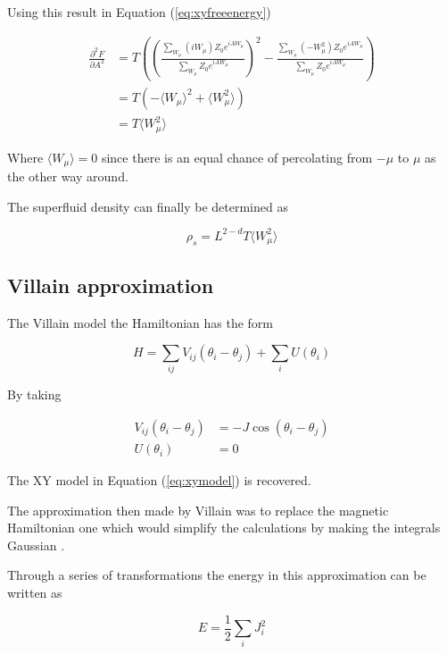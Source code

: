 Using this result in Equation (\ref{eq:xyfreeenergy})

\begin{align}
    \frac{\partial^2 F}{\partial A^2} &= T \left ( \left ( \frac{\sum_{W_\mu} (i W_\mu) Z_0 e^{iAW_\mu}}{\sum_{W_\mu} Z_0 e^{iAW_\mu}} \right )^2 - \frac{\sum_{W_\mu} (- W_\mu^2) Z_0 e^{iAW_\mu}}{\sum_{W_\mu} Z_0 e^{iAW_\mu}} \right ) \\
%
    &= T \left ( -\langle W_\mu \rangle^2 + \langle W_\mu^2 \rangle \right ) \\
%
    &= T \langle W_\mu^2 \rangle
\end{align}

Where $\langle W_\mu \rangle = 0$ since there is an equal chance of percolating from $-\mu$ to $\mu$ as the other way around.

The superfluid density can finally be determined as

\begin{equation}
    \rho_s = L^{2 - d} T \langle W_\mu^2 \rangle 
\end{equation}

\subsection{Villain approximation}
\label{subsec:villainApprox}


The Villain model the Hamiltonian has the form \cite{Villain:VillainOriginalPaper}

\begin{equation}    
    H = \sum_{ij} V_{ij}( \theta_i - \theta_j) + \sum_i U(\theta_i)
\end{equation}

By taking

\begin{align}
    V_{ij}( \theta_i - \theta_j) &= -J \cos ( \theta_i - \theta_j) \\
    U( \theta_i ) &= 0
\end{align}

The XY model in Equation (\ref{eq:xymodel}) is recovered.

The approximation then made by Villain was to replace the magnetic Hamiltonian one which would simplify the calculations by making the integrals Gaussian \cite{Villain:VillainOriginalPaper}.

Through a series of transformations the energy in this approximation can be written as \cite{Jos:VillainExtended}

\begin{equation}
    E = \frac{1}{2} \sum_i J_i^2
\end{equation}

